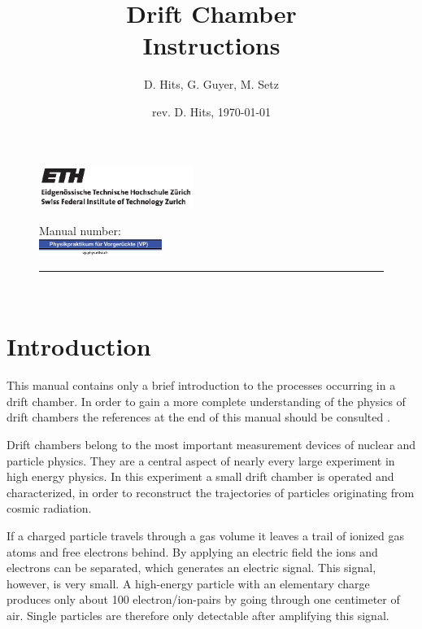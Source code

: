 \documentclass[12pt]{article}
\begin{document}
\begin{figure}
\begin{minipage}{0.5\linewidth}
\begin{flushleft}
\includegraphics[width=5cm]{pics/ethlogo_black.eps}
\end{flushleft}
\end{minipage}
\hspace{0.05cm}
\begin{minipage}{0.5\linewidth}
\begin{flushright}
Manual number:\hspace{2cm}\\[0.5cm]
\includegraphics[width=4cm]{pics/VP-Logo.eps}
\end{flushright}
\end{minipage}
\hrule height 1pt\hfill \\[3cm]
\end{figure} 

\title{Drift Chamber\\ Instructions}
\author{D. Hits, G. Guyer, M. Setz}
\date{rev. D. Hits, \today}
\maketitle

\newpage
\section{Introduction}

This manual contains only a brief introduction to the processes occurring in a drift chamber. In order to gain a more complete understanding of the physics of drift chambers the references at the end of this manual should be consulted \cite{DriftChamberBook, knoll, NIMwiki}. 

Drift chambers belong to the most important measurement devices of nuclear and particle physics. They are a central aspect of nearly every large experiment in high energy physics. In this experiment a small drift chamber is operated and characterized, in order to reconstruct the trajectories of particles originating from cosmic radiation. 

If a charged particle travels through a gas volume it leaves a trail of ionized gas atoms and free electrons behind. By applying an electric field the ions and electrons can be separated, which generates an electric signal. This signal, however, is very small. A high-energy particle with an elementary charge produces only about 100 electron/ion-pairs by going through one centimeter of air. Single particles are therefore only detectable after amplifying this signal. 
\end{document}
